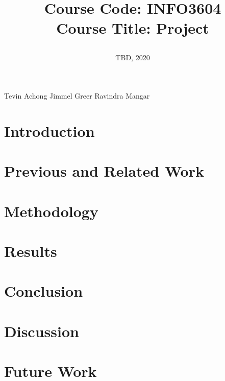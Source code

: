 \documentclass[a4paper, 12pt]{article}
\begin{document}
\title{
		\textbf{Course Code:} INFO3604\\
		\textbf{Course Title:} Project\\
		\date{TBD, 2020}
}
\maketitle

\begin{center}
Tevin Achong Jimmel Greer Ravindra Mangar
\end{center}


\newpage
\tableofcontents


\newpage
\section{Introduction}

\newpage
\section{Previous and Related Work}

\newpage
\section{Methodology}

\newpage
\section{Results}

\newpage
\section{Conclusion}

\newpage
\section{Discussion}

\newpage
\section{Future Work}
\end{document}
